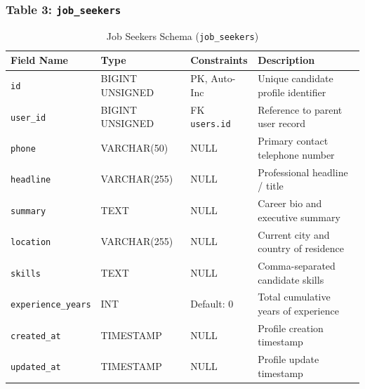 \subsubsection{Table 3: \texttt{job\_seekers}}
\begin{table}[H]
\centering
\small
\caption{Job Seekers Schema (\texttt{job\_seekers})}
\label{tab:schema_job_seekers}
\begin{tabular}{|p{3cm}|p{2.8cm}|p{2.2cm}|p{5.5cm}|}
\hline
\textbf{Field Name} & \textbf{Type} & \textbf{Constraints} & \textbf{Description} \\ \hline
\texttt{id} & BIGINT UNSIGNED & PK, Auto-Inc & Unique candidate profile identifier \\ \hline
\texttt{user\_id} & BIGINT UNSIGNED & FK \texttt{users.id} & Reference to parent user record \\ \hline
\texttt{phone} & VARCHAR(50) & NULL & Primary contact telephone number \\ \hline
\texttt{headline} & VARCHAR(255) & NULL & Professional headline / title \\ \hline
\texttt{summary} & TEXT & NULL & Career bio and executive summary \\ \hline
\texttt{location} & VARCHAR(255) & NULL & Current city and country of residence \\ \hline
\texttt{skills} & TEXT & NULL & Comma-separated candidate skills \\ \hline
\texttt{experience\_years}& INT & Default: 0 & Total cumulative years of experience \\ \hline
\texttt{created\_at} & TIMESTAMP & NULL & Profile creation timestamp \\ \hline
\texttt{updated\_at} & TIMESTAMP & NULL & Profile update timestamp \\ \hline
\end{tabular}
\end{table}


